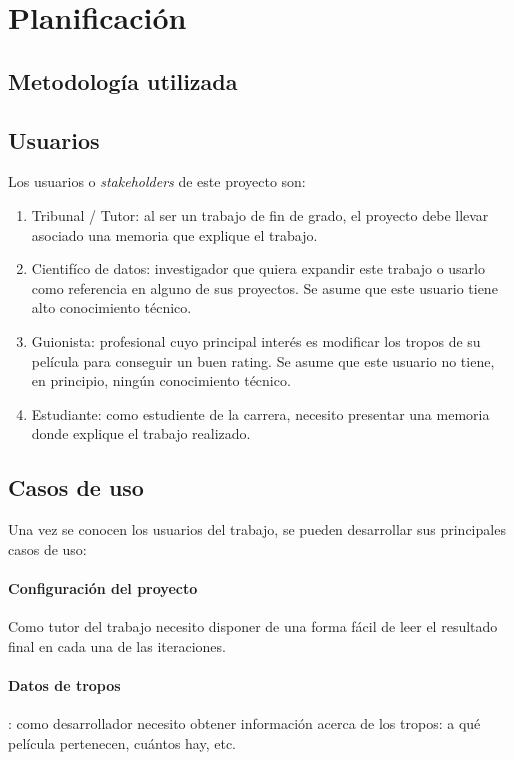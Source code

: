\chapter{Planificación}

\section{Metodología utilizada}


\section{Usuarios}

Los usuarios o \textit{stakeholders} de este proyecto son:

\begin{enumerate}
      \item Tribunal / Tutor: al ser un trabajo de fin de grado, el proyecto debe llevar asociado una memoria
            que explique el trabajo.
      \item Cientifíco de datos: investigador que quiera expandir este trabajo o usarlo como
            referencia en alguno de sus proyectos. Se asume que este usuario tiene alto conocimiento técnico.
      \item Guionista: profesional cuyo principal interés es modificar los tropos de su película para
            conseguir un buen rating. Se asume que este usuario no tiene, en principio, ningún conocimiento
            técnico.
      \item Estudiante: como estudiente de la carrera, necesito presentar una memoria donde explique el trabajo realizado.
\end{enumerate}

\section{Casos de uso}

Una vez se conocen los usuarios del trabajo, se pueden desarrollar sus principales casos de uso:

\subsubsection*{Configuración del proyecto} \label{uc:configuration}

Como tutor del trabajo necesito disponer de una forma fácil de leer el resultado final en cada
una de las iteraciones.

\subsubsection*{Datos de tropos}\label{uc:trope_data}: como desarrollador necesito obtener información acerca de los
tropos: a qué película pertenecen, cuántos hay, etc.

